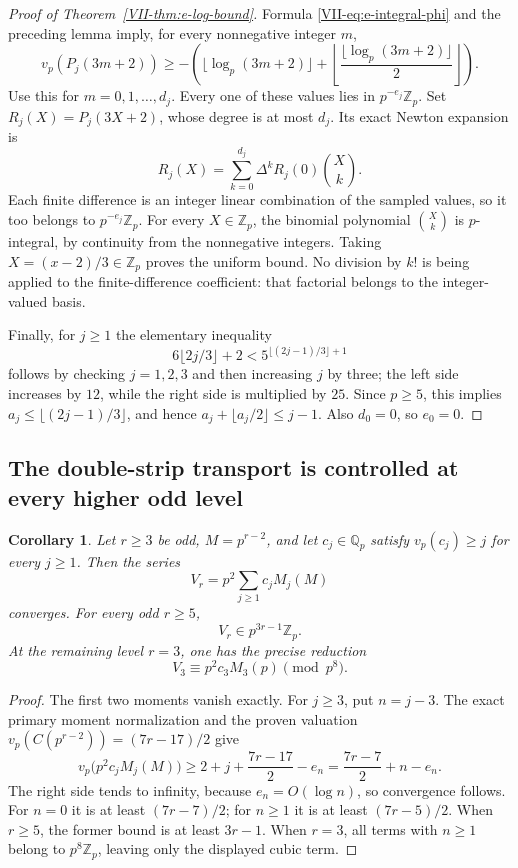 \documentclass[11pt,letterpaper]{article}
\newtheorem{corollary}[theorem]{Corollary}
\numberwithin{equation}{section}
\begin{document}
\begin{proof}[Proof of Theorem~\ref{VII-thm:e-log-bound}]
Formula \eqref{VII-eq:e-integral-phi} and the preceding lemma imply, for
every nonnegative integer $m$,
\[
 v_p(P_j(3m+2))\ge
 -\left(\lfloor\log_p(3m+2)\rfloor+
 \left\lfloor\frac{\lfloor\log_p(3m+2)\rfloor}{2}\right\rfloor\right).
\]
Use this for $m=0,1,\ldots,d_j$. Every one of these values lies in
$p^{-e_j}\mathbb Z_p$. Set $R_j(X)=P_j(3X+2)$, whose degree is at
most $d_j$. Its exact Newton expansion is
\[
 R_j(X)=\sum_{k=0}^{d_j}\Delta^kR_j(0)\binom Xk.
\]
Each finite difference is an integer linear combination of the
sampled values, so it too belongs to $p^{-e_j}\mathbb Z_p$.
For every $X\in\mathbb Z_p$, the binomial polynomial $\binom Xk$
is $p$-integral, by continuity from the nonnegative integers.
Taking $X=(x-2)/3\in\mathbb Z_p$ proves the uniform bound.
No division by $k!$ is being applied to the finite-difference
coefficient: that factorial belongs to the integer-valued basis.

Finally, for $j\ge1$ the elementary inequality
\[
 6\lfloor2j/3\rfloor+2<5^{\lfloor(2j-1)/3\rfloor+1}
\]
follows by checking $j=1,2,3$ and then increasing $j$ by three;
the left side increases by $12$, while the right side is multiplied
by $25$. Since $p\ge5$, this implies
$a_j\le\lfloor(2j-1)/3\rfloor$, and hence
$a_j+\lfloor a_j/2\rfloor\le j-1$. Also $d_0=0$, so $e_0=0$.
\end{proof}

\subsection{The double-strip transport is controlled at every higher odd level}
\begin{corollary}\label{VII-cor:e-double-strip-transport-bound}
Let $r\ge3$ be odd, $M=p^{r-2}$, and let $c_j\in\mathbb Q_p$ satisfy
$v_p(c_j)\ge j$ for every $j\ge1$. Then the series
\[
 V_r=p^2\sum_{j\ge1}c_jM_j(M)
\]
converges. For every odd $r\ge5$,
\[
 V_r\in p^{3r-1}\mathbb Z_p.
\]
At the remaining level $r=3$, one has the precise reduction
\[
 V_3\equiv p^2c_3M_3(p)\pmod{p^8}.
\]
\end{corollary}
\begin{proof}
The first two moments vanish exactly. For $j\ge3$, put $n=j-3$.
The exact primary moment normalization and the proven valuation
$v_p(C(p^{r-2}))=(7r-17)/2$ give
\[
 v_p\bigl(p^2c_jM_j(M)\bigr)
 \ge2+j+\frac{7r-17}{2}-e_n
 =\frac{7r-7}{2}+n-e_n.
\]
The right side tends to infinity, because $e_n=O(\log n)$, so
convergence follows. For $n=0$ it is at least $(7r-7)/2$;
for $n\ge1$ it is at least $(7r-5)/2$.
When $r\ge5$, the former bound is at least $3r-1$. When $r=3$,
all terms with $n\ge1$ belong to $p^8\mathbb Z_p$, leaving only
the displayed cubic term.
\end{proof}
\end{document}
